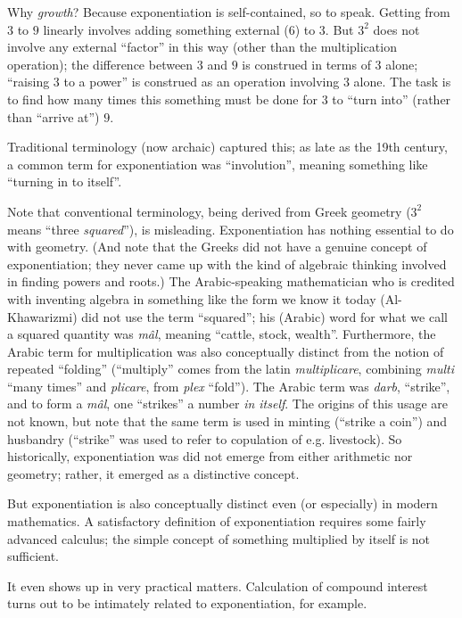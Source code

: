 \documentclass[reqno,12pt]{tufte-book}
\numberwithin{equation}{subsection}
\begin{document}
Why \textit{growth}?  Because exponentiation is self-contained, so to
speak.  Getting from $3$ to $9$ linearly involves adding something
external ($6$) to $3$.  But $3^2$ does not involve any external
``factor'' in this way (other than the multiplication operation); the
difference between $3$ and $9$ is construed in terms of $3$ alone;
``raising $3$ to a power'' is construed as an operation involving $3$
alone.  The task is to find how many times this something must be done
for $3$ to ``turn into'' (rather than ``arrive at'') $9$.

Traditional terminology (now archaic) captured this; as late as the
19th century, a common term for exponentiation was ``involution'',
meaning something like ``turning in to itself''.

Note that conventional terminology, being derived from Greek geometry
($3^2$ means ``three \textit{squared}''), is misleading.
Exponentiation has nothing essential to do with geometry.  (And note
that the Greeks did not have a genuine concept of exponentiation; they
never came up with the kind of algebraic thinking involved in finding
powers and roots.)  The Arabic-speaking mathematician who is credited
with inventing algebra in something like the form we know it today
(Al-Khawarizmi) did not use the term ``squared''; his (Arabic) word
for what we call a squared quantity was \textit{m\^{a}l}, meaning
``cattle, stock, wealth''.  Furthermore, the Arabic term for
multiplication was also conceptually distinct from the notion of
repeated ``folding'' (``multiply'' comes from the latin
\textit{multiplicare}, combining \textit{multi} ``many times'' and
\textit{plicare}, from \textit{plex} ``fold'').  The Arabic term was
\textit{darb}, ``strike'', and to form a \textit{m\^{a}l}, one
``strikes'' a number \textit{in itself}.  The origins of this usage
are not known, but note that the same term is used in minting
(``strike a coin'') and husbandry (``strike'' was used to refer to
copulation of e.g. livestock).  So historically, exponentiation was
did not emerge from either arithmetic nor geometry; rather, it emerged
as a distinctive concept.

But exponentiation is also conceptually distinct even (or especially)
in modern mathematics.  A satisfactory definition of exponentiation
requires some fairly advanced calculus; the simple concept of
something multiplied by itself is not sufficient.

It even shows up in very practical matters.  Calculation of compound
interest turns out to be intimately related to exponentiation, for
example.
\end{document}

